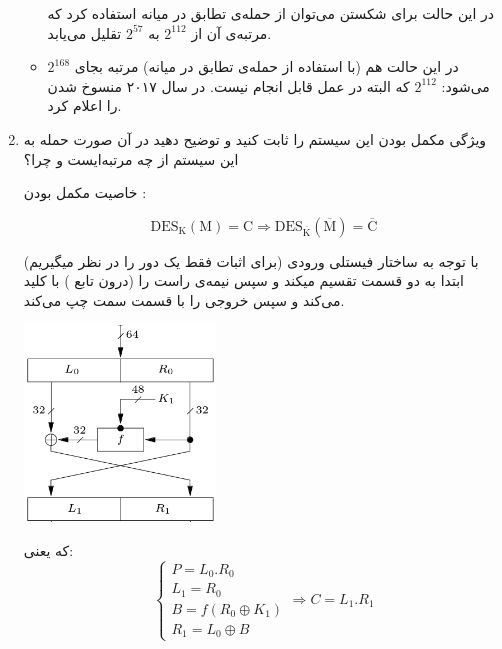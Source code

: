 \documentclass{article}
\begin{document}
\begin{enumerate}[label=\alph*)]
\begin{itemize}
در این حالت برای شکستن می‌توان از حمله‌ی تطابق در میانه استفاده کرد که مرتبه‌ی آن از 
$2^{112}$
به
$2^{57}$ 
تقلیل می‌یابد.

\item {}

در این حالت هم (با استفاده از حمله‌ی تطابق در میانه) مرتبه بجای 
$2^{168}$
می‌شود:
$2^{112}$ که البته در عمل قابل انجام نیست. در سال ۲۰۱۷ 
منسوخ شدن
را اعلام کرد.

\end{itemize}
\item 
ویژگی مکمل بودن این سیستم را ثابت کنید و توضیح دهید در آن صورت حمله به
این سیستم از چه مرتبه‌ایست و چرا؟

خاصیت مکمل بودن 
:
\begin{latin}
\begin{equation}
\text{DES}_\text{K}(\text{M}) = \text{C}
\Rightarrow
\text{DES}_{\overline{\text{K}}}(\overline{\text{M}}) = \overline{\text{C}}
\end{equation}
\end{latin}

(برای اثبات فقط یک دور را در نظر میگیریم) با توجه به ساختار فیستلی 
ورودی ابتدا به دو قسمت تقسیم میکند و سپس نیمه‌ی راست را (درون تابع ) با کلید 
می‌کند و سپس خروجی را با قسمت سمت چپ 
می‌کند.
\begin{center}
\includegraphics[width=0.4\textwidth, height=0.35\textheight]{des-feistel}
\end{center}
که یعنی:
\begin{equation}
\begin{cases}
P = L_0.R_0\\
L_1 = R_0 \\
B = f(R_0 \oplus K_1) \\
R_1 = L_0 \oplus B
\end{cases}
\Rightarrow C = L_1.R_1
\end{equation}


\end{enumerate}
\end{document}
